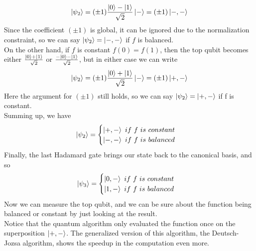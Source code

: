 \documentclass[12pt,a4paper]{report}
\theoremstyle{definition}
\theoremstyle{definition}
\theoremstyle{definition}
\begin{document}
\begin{equation*}
    \ket{\psi_2}=(\pm 1)\frac{\ket{0}-\ket{1}}{\sqrt{2}}\ket{-}=(\pm 1)\ket{-,-}
\end{equation*}
Since the coefficient $(\pm 1)$ is global, it can be ignored due to the normalization constraint, so we can say $\ket{\psi_2}=\ket{-,-}$ if $f$ is balanced.\\
On the other hand, if $f$ is constant $f(0)=f(1)$, then the top qubit becomes either $\frac{\ket{0}+\ket{1}}{\sqrt{2}}$ or $\frac{-\ket{0}-\ket{1}}{\sqrt{2}}$, but in either case we can write
\begin{equation*}
    \ket{\psi_2}=(\pm 1)\frac{\ket{0}+\ket{1}}{\sqrt{2}}\ket{-}=(\pm 1)\ket{+,-}
\end{equation*}
Here the argument for $(\pm 1)$ still holds, so we can say $\ket{\psi_2}=\ket{+,-}$ if f is constant.\\
Summing up, we have
\begin{equation*}
    \ket{\psi_2}=\begin{cases}
        \ket{+,-}\ if\ f\ is\ constant\\
        \ket{-,-}\ if\ f\ is\ balanced
    \end{cases}
\end{equation*}
Finally, the last Hadamard gate brings our state back to the canonical basis, and so
\begin{equation*}
    \ket{\psi_3} = \begin{cases}
        \ket{0,-}\ if\ f\ is\ constant\\
        \ket{1,-}\ if\ f\ is\ balanced
    \end{cases}
\end{equation*}
Now we can measure the top qubit, and we can be sure about the function being balanced or constant by just looking at the result.\\
Notice that the quantum algorithm only evaluated the function once on the superposition $\ket{+,-}$. The generalized version of this algorithm, the Deutsch-Jozsa algorithm, shows the speedup in the computation even more.
\end{document}
